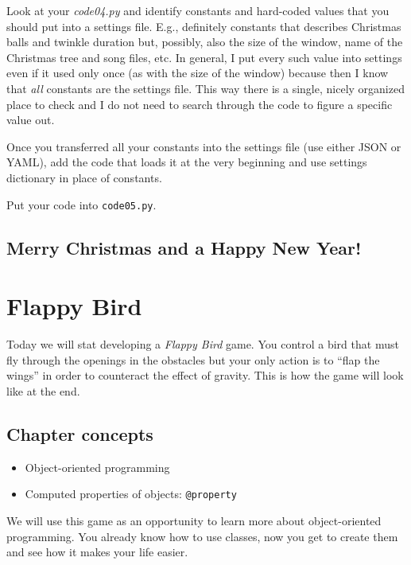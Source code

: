 \documentclass[
]{book}
\providecommand{\tightlist}{%
  \setlength{\itemsep}{0pt}\setlength{\parskip}{0pt}}
\begin{document}
Look at your \emph{code04.py} and identify constants and hard-coded values that you should put into a settings file. E.g., definitely constants that describes Christmas balls and twinkle duration but, possibly, also the size of the window, name of the Christmas tree and song files, etc. In general, I put every such value into settings even if it used only once (as with the size of the window) because then I know that \emph{all} constants are the settings file. This way there is a single, nicely organized place to check and I do not need to search through the code to figure a specific value out.

Once you transferred all your constants into the settings file (use either JSON or YAML), add the code that loads it at the very beginning and use settings dictionary in place of constants.

Put your code into \texttt{code05.py}.

\hypertarget{merry-christmas-and-a-happy-new-year}{%
\section{Merry Christmas and a Happy New Year!}\label{merry-christmas-and-a-happy-new-year}}

\hypertarget{flappy-bird}{%
\chapter{Flappy Bird}\label{flappy-bird}}

Today we will stat developing a \emph{Flappy Bird} game. You control a bird that must fly through the openings in the obstacles but your only action is to ``flap the wings'' in order to counteract the effect of gravity. This is how the game will look like at the end.

\hypertarget{chapter-concepts-7}{%
\section{Chapter concepts}\label{chapter-concepts-7}}

\begin{itemize}
\tightlist
\item
  Object-oriented programming
\item
  Computed properties of objects: \texttt{@property}
\end{itemize}

We will use this game as an opportunity to learn more about object-oriented programming. You already know how to use classes, now you get to create them and see how it makes your life easier.
\end{document}
